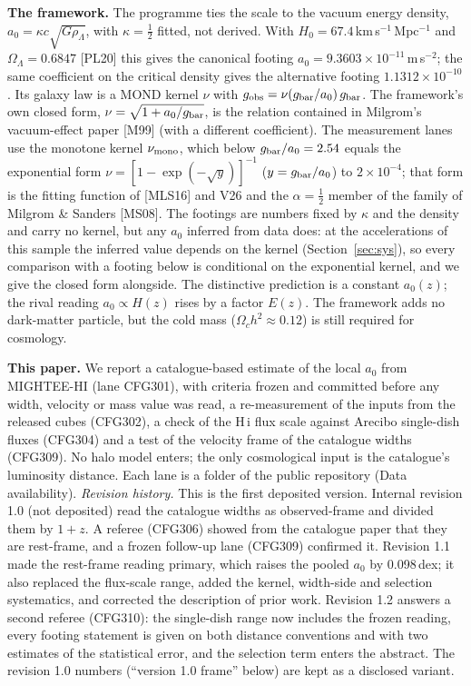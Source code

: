 \documentclass[10pt]{article}
\begin{document}
\textbf{The framework.} The programme ties the scale to the vacuum energy density, $a_0=\kappa c\sqrt{G\rho_\Lambda}$, with $\kappa=\tfrac12$ fitted, not derived. With $H_0=67.4$\,km\,s$^{-1}$\,Mpc$^{-1}$ and $\Omega_\Lambda=0.6847$ [PL20] this gives the canonical footing $a_0=9.3603\times10^{-11}$\,m\,s$^{-2}$; the same coefficient on the critical density gives the alternative footing $1.1312\times10^{-10}$. Its galaxy law is a MOND kernel $\nu$ with $g_{\rm obs}=\nu(g_{\rm bar}/a_0)\,g_{\rm bar}$. The framework's own closed form, $\nu=\sqrt{1+a_0/g_{\rm bar}}$, is the relation contained in Milgrom's vacuum-effect paper [M99] (with a different coefficient). The measurement lanes use the monotone kernel $\nu_{\rm mono}$, which below $g_{\rm bar}/a_0=2.54$ equals the exponential form $\nu=[1-\exp(-\sqrt{y})]^{-1}$ ($y=g_{\rm bar}/a_0$) to $2\times10^{-4}$; that form is the fitting function of [MLS16] and V26 and the $\alpha=\tfrac12$ member of the family of Milgrom \& Sanders [MS08]. The footings are numbers fixed by $\kappa$ and the density and carry no kernel, but any $a_0$ inferred from data does: at the accelerations of this sample the inferred value depends on the kernel (Section~\ref{sec:sys}), so every comparison with a footing below is conditional on the exponential kernel, and we give the closed form alongside. The distinctive prediction is a constant $a_0(z)$; the rival reading $a_0\propto H(z)$ rises by a factor $E(z)$. The framework adds no dark-matter particle, but the cold mass ($\Omega_ch^2\approx0.12$) is still required for cosmology.

\textbf{This paper.} We report a catalogue-based estimate of the local $a_0$ from MIGHTEE-HI (lane CFG301), with criteria frozen and committed before any width, velocity or mass value was read, a re-measurement of the inputs from the released cubes (CFG302), a check of the H\,{\sc i} flux scale against Arecibo single-dish fluxes (CFG304) and a test of the velocity frame of the catalogue widths (CFG309). No halo model enters; the only cosmological input is the catalogue's luminosity distance. Each lane is a folder of the public repository (Data availability). \emph{Revision history.} This is the first deposited version. Internal revision 1.0 (not deposited) read the catalogue widths as observed-frame and divided them by $1+z$. A referee (CFG306) showed from the catalogue paper that they are rest-frame, and a frozen follow-up lane (CFG309) confirmed it. Revision 1.1 made the rest-frame reading primary, which raises the pooled $a_0$ by 0.098\,dex; it also replaced the flux-scale range, added the kernel, width-side and selection systematics, and corrected the description of prior work. Revision 1.2 answers a second referee (CFG310): the single-dish range now includes the frozen reading, every footing statement is given on both distance conventions and with two estimates of the statistical error, and the selection term enters the abstract. The revision 1.0 numbers (``version 1.0 frame'' below) are kept as a disclosed variant.
\end{document}
